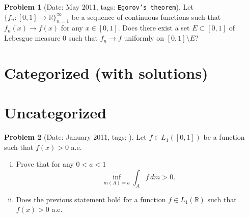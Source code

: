 \documentclass[11pt, notitlepage]{article}
\theoremstyle{definition}
\theoremstyle{definition}
\theoremstyle{definition}
\newtheorem{probstate}{Problem}
\theoremstyle{remark}
\newenvironment{problem}[2]{
    \begin{probstate}[Date: #1, tags: \texttt{#2}]
}
{
  \end{probstate}
}
\newcommand{\R}{\mathbb{R}}
\begin{document}
\begin{problem}{May 2011}{Egorov's theorem}
  Let $\{f_n: [0,1] \to \R\}_{n=1}^\infty$ be a sequence of continuous functions
     such that $f_n(x) \to f(x)$ for any $x \in [0,1]$. Does there
     exist a set $E \subset [0,1]$ of Lebesgue measure 0 such that
     $f_n \to f$ uniformly on $[0,1] \setminus E$?
\end{problem}

\section{Categorized (with solutions)}

\section{Uncategorized}

\begin{problem}{January 2011}{}
  Let $f \in L_1([0,1])$ be a function such that $f(x)>0$ a.e.
 \begin{enumerate}[(i)]
 \item Prove that for any $0<a<1$
 \[
   \inf_{m(A)=a} \int_A f \, dm >0.
 \]
 \item Does the previous statement hold for a function $f \in L_1(\mathbb R)$ such that $f(x)>0$ a.e.
 \end{enumerate}
\end{problem}
\end{document}

